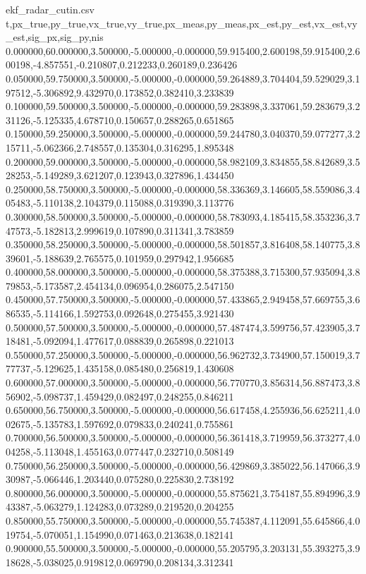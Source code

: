 \begin{filecontents*}[overwrite]{ekf_radar_cutin.csv}
t,px_true,py_true,vx_true,vy_true,px_meas,py_meas,px_est,py_est,vx_est,vy_est,sig_px,sig_py,nis
0.000000,60.000000,3.500000,-5.000000,-0.000000,59.915400,2.600198,59.915400,2.600198,-4.857551,-0.210807,0.212233,0.260189,0.236426
0.050000,59.750000,3.500000,-5.000000,-0.000000,59.264889,3.704404,59.529029,3.197512,-5.306892,9.432970,0.173852,0.382410,3.233839
0.100000,59.500000,3.500000,-5.000000,-0.000000,59.283898,3.337061,59.283679,3.231126,-5.125335,4.678710,0.150657,0.288265,0.651865
0.150000,59.250000,3.500000,-5.000000,-0.000000,59.244780,3.040370,59.077277,3.215711,-5.062366,2.748557,0.135304,0.316295,1.895348
0.200000,59.000000,3.500000,-5.000000,-0.000000,58.982109,3.834855,58.842689,3.528253,-5.149289,3.621207,0.123943,0.327896,1.434450
0.250000,58.750000,3.500000,-5.000000,-0.000000,58.336369,3.146605,58.559086,3.405483,-5.110138,2.104379,0.115088,0.319390,3.113776
0.300000,58.500000,3.500000,-5.000000,-0.000000,58.783093,4.185415,58.353236,3.747573,-5.182813,2.999619,0.107890,0.311341,3.783859
0.350000,58.250000,3.500000,-5.000000,-0.000000,58.501857,3.816408,58.140775,3.839601,-5.188639,2.765575,0.101959,0.297942,1.956685
0.400000,58.000000,3.500000,-5.000000,-0.000000,58.375388,3.715300,57.935094,3.879853,-5.173587,2.454134,0.096954,0.286075,2.547150
0.450000,57.750000,3.500000,-5.000000,-0.000000,57.433865,2.949458,57.669755,3.686535,-5.114166,1.592753,0.092648,0.275455,3.921430
0.500000,57.500000,3.500000,-5.000000,-0.000000,57.487474,3.599756,57.423905,3.718481,-5.092094,1.477617,0.088839,0.265898,0.221013
0.550000,57.250000,3.500000,-5.000000,-0.000000,56.962732,3.734900,57.150019,3.777737,-5.129625,1.435158,0.085480,0.256819,1.430608
0.600000,57.000000,3.500000,-5.000000,-0.000000,56.770770,3.856314,56.887473,3.856902,-5.098737,1.459429,0.082497,0.248255,0.846211
0.650000,56.750000,3.500000,-5.000000,-0.000000,56.617458,4.255936,56.625211,4.002675,-5.135783,1.597692,0.079833,0.240241,0.755861
0.700000,56.500000,3.500000,-5.000000,-0.000000,56.361418,3.719959,56.373277,4.004258,-5.113048,1.455163,0.077447,0.232710,0.508149
0.750000,56.250000,3.500000,-5.000000,-0.000000,56.429869,3.385022,56.147066,3.930987,-5.066446,1.203440,0.075280,0.225830,2.738192
0.800000,56.000000,3.500000,-5.000000,-0.000000,55.875621,3.754187,55.894996,3.943387,-5.063279,1.124283,0.073289,0.219520,0.204255
0.850000,55.750000,3.500000,-5.000000,-0.000000,55.745387,4.112091,55.645866,4.019754,-5.070051,1.154990,0.071463,0.213638,0.182141
0.900000,55.500000,3.500000,-5.000000,-0.000000,55.205795,3.203131,55.393275,3.918628,-5.038025,0.919812,0.069790,0.208134,3.312341

\end{filecontents*}
